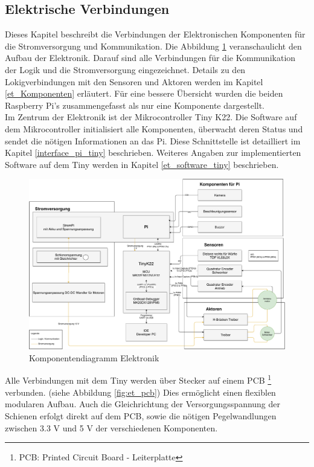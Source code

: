 \documentclass[../../main.tex]{subfiles}
\begin{document}
    \subsection{Elektrische Verbindungen} \label{et_verbindungen}
    Dieses Kapitel beschreibt die Verbindungen der Elektronischen Komponenten für die Stromversorgung und Kommunikation. Die Abbildung \ref{fig:et_komponenten} veranschaulicht den Aufbau der Elektronik. Darauf sind alle Verbindungen für die Kommunikation der Logik und die Stromversorgung eingezeichnet. Details zu den Lokigverbindungen mit den Sensoren und Aktoren werden im Kapitel \ref{et_Komponenten} erläutert. Für eine bessere Übersicht wurden die beiden Raspberry Pi's zusammengefasst als nur eine Komponente dargestellt.\\
    Im Zentrum der Elektronik ist der Mikrocontroller Tiny K22. Die Software auf dem Mikrocontroller initialisiert alle Komponenten, überwacht deren Status und sendet die nötigen Informationen an das Pi. Diese Schnittstelle ist detailliert im Kapitel \ref{interface_pi_tiny} beschrieben. Weiteres Angaben zur implementierten Software auf dem Tiny werden in Kapitel \ref{et_software_tiny} beschrieben.\\

    \begin{figure}[H]
        \centering
        \includegraphics[width=1.0\textwidth]{../../images/et/KomponentenDiagramm_ET.pdf}
        \caption {Komponentendiagramm Elektronik}
        \label{fig:et_komponenten}
    \end{figure}

    Alle Verbindungen mit dem Tiny werden über Stecker auf einem PCB \footnote{PCB: Printed Circuit Board - Leiterplatte} verbunden. (siehe Abbildung \ref{fig:et_pcb}) Dies ermöglicht einen flexiblen modularen Aufbau. Auch die Gleichrichtung der Versorgungsspannung der Schienen erfolgt direkt auf dem PCB, sowie die nötigen Pegelwandlungen zwischen 3.3 V und 5 V der verschiedenen Komponenten.\\
\end{document}
